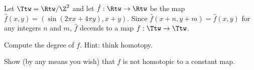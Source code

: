 Let $\Ttw=\Rtw/\Z^2$ and let $\hat{f}:\Rtw\rightarrow \Rtw$ be the map
$\hat{f}(x,y)=(\sin(2\pi x + 4\pi y),x+y)$. Since
$\hat{f}(x+n,y+m)=\hat{f}(x,y)$ for any integers $n$ and $m$,
$\hat{f}$ decends to a map $f:\Ttw\rightarrow \Ttw$.
\begin{alist}
\item Compute the degree of $f$. Hint: think homotopy.
\item Show (by any means you wish) that $f$ is not homotopic to a
constant map.
\end{alist}
